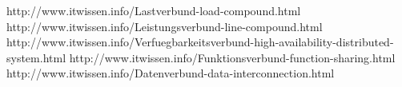 \documentclass[12pt,a4paper,oneside,german]{article}
\begin{document}
		
		


\begin{thebibliography}{}
	 http://www.itwissen.info/Lastverbund-load-compound.html
	 http://www.itwissen.info/Leistungsverbund-line-compound.html
	 http://www.itwissen.info/Verfuegbarkeitsverbund-high-availability-distributed-system.html
	  http://www.itwissen.info/Funktionsverbund-function-sharing.html
	 http://www.itwissen.info/Datenverbund-data-interconnection.html
\end{thebibliography}
\end{document}
